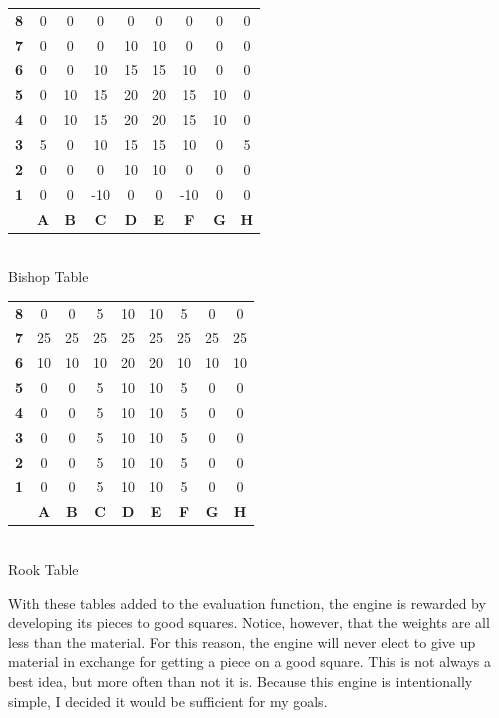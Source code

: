 \documentclass[11pt]{article}
\begin{document}
\begin{center}
\begin{tabular}{c c c c c c c c c}
\textbf{8} & 0  & 0  & 0  & 0  & 0  & 0  & 0  & 0  \\
\textbf{7} & 0  & 0  & 0  & 10 & 10 & 0  & 0  & 0 \\
\textbf{6} & 0  & 0  & 10 & 15 & 15 & 10 & 0  & 0 \\
\textbf{5} & 0  & 10 & 15 & 20 & 20 & 15 & 10 & 0  \\
\textbf{4} & 0  & 10 & 15 & 20 & 20 & 15 & 10 & 0  \\
\textbf{3} & 5  & 0  & 10 & 15 & 15 & 10 & 0  & 5  \\
\textbf{2} & 0  & 0  & 0  & 10 & 10 & 0  & 0  & 0 \\
\textbf{1} & 0  & 0  &-10 & 0  & 0  &-10 & 0  & 0  \\
  & \textbf{A}  & \textbf{B}  & \textbf{C}  & \textbf{D}  & \textbf{E}  & \textbf{F}  & \textbf{G}  & \textbf{H}
\end{tabular} \\
Bishop Table
\end{center}

\begin{center}
\begin{tabular}{c c c c c c c c c}
\textbf{8} & 0  & 0  & 5  & 10 & 10 & 5  & 0  & 0  \\
\textbf{7} & 25 & 25 & 25 & 25 & 25 & 25 & 25 & 25 \\
\textbf{6} & 10 & 10 & 10 & 20 & 20 & 10 & 10 & 10 \\
\textbf{5} & 0  & 0  & 5  & 10 & 10 & 5  & 0  & 0  \\
\textbf{4} & 0  & 0  & 5  & 10 & 10 & 5  & 0  & 0  \\
\textbf{3} & 0  & 0  & 5  & 10 & 10 & 5  & 0  & 0  \\
\textbf{2} & 0  & 0  & 5  & 10 & 10 & 5  & 0  & 0  \\
\textbf{1} & 0  & 0  & 5  & 10 & 10 & 5  & 0  & 0  \\
  & \textbf{A}  & \textbf{B}  & \textbf{C}  & \textbf{D}  & \textbf{E}  & \textbf{F}  & \textbf{G}  & \textbf{H}
\end{tabular} \\
Rook Table
\end{center} 

With these tables added to the evaluation function, the engine is rewarded by developing its pieces to good squares. Notice, however, that the weights are all less than the material. For this reason, the engine will never elect to give up material in exchange for getting a piece on a good square. This is not always a best idea, but more often than not it is. Because this engine is intentionally simple, I decided it would be sufficient for my goals.
\end{document}
